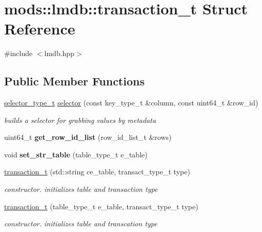 \hypertarget{structmods_1_1lmdb_1_1transaction__t}{}\section{mods\+:\+:lmdb\+:\+:transaction\+\_\+t Struct Reference}
\label{structmods_1_1lmdb_1_1transaction__t}


{\ttfamily \#include $<$lmdb.\+hpp$>$}

\subsection*{Public Member Functions}
\begin{DoxyCompactItemize}
\item 
\hyperlink{structmods_1_1lmdb_1_1__selector}{selector\+\_\+type\+\_\+t} \hyperlink{structmods_1_1lmdb_1_1transaction__t_a3ad01fb11426f89327765dc0055d94a3}{selector} (const key\+\_\+type\+\_\+t \&column, const uint64\+\_\+t \&row\+\_\+id)
\begin{DoxyCompactList}\small\item\em builds a selector for grabbing values by metadata \end{DoxyCompactList}\item 
\mbox{\label{structmods_1_1lmdb_1_1transaction__t_af4013121c80d588b0916a98662e4295f}} 
uint64\+\_\+t {\bfseries get\+\_\+row\+\_\+id\+\_\+list} (row\+\_\+id\+\_\+list\+\_\+t \&rows)
\item 
\mbox{\label{structmods_1_1lmdb_1_1transaction__t_aa130620f69dc71f180e6ef9771373d0d}} 
void {\bfseries set\+\_\+str\+\_\+table} (table\+\_\+type\+\_\+t e\+\_\+table)
\item 
\hyperlink{structmods_1_1lmdb_1_1transaction__t_a37e8dc8e3f9e3f705bdb801d829210ff}{transaction\+\_\+t} (std\+::string ce\+\_\+table, transact\+\_\+type\+\_\+t type)
\begin{DoxyCompactList}\small\item\em constructor. initializes table and transaction type \end{DoxyCompactList}\item 
\hyperlink{structmods_1_1lmdb_1_1transaction__t_a516bc4084eb3ed2b282e7d059b2ef409}{transaction\+\_\+t} (table\+\_\+type\+\_\+t e\+\_\+table, transact\+\_\+type\+\_\+t type)
\begin{DoxyCompactList}\small\item\em constructor. initializes table and transcation type \end{DoxyCompactList}\item 

\end{DoxyCompactItemize}

